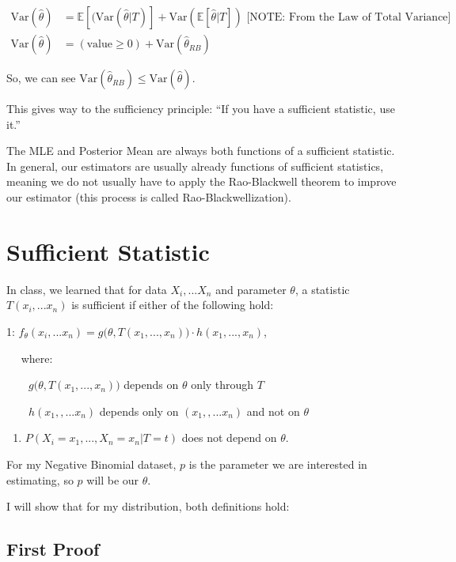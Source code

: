 \documentclass[
  letterpaper,
  DIV=11,
  numbers=noendperiod]{scrreprt}
\providecommand{\tightlist}{%
  \setlength{\itemsep}{0pt}\setlength{\parskip}{0pt}}
\begin{document}
\[
\begin{aligned}
\text{Var}(\hat{\theta}) &= \mathbb{E}[(\text{Var}(\hat{\theta}|T)] + \text{Var}(\mathbb{E}[\hat{\theta}|T]) \text{   [NOTE: From the Law of Total Variance]} \\
\text{Var}(\hat{\theta}) &= (\text{value} \geq 0) + \text{Var}(\hat{\theta}_{RB})
\end{aligned}
\]

So, we can see
\(\text{Var}(\hat{\theta}_{RB}) \leq \text{Var}(\hat{\theta})\).

This gives way to the sufficiency principle: ``If you have a sufficient
statistic, use it.''

The MLE and Posterior Mean are always both functions of a sufficient
statistic. In general, our estimators are usually already functions of
sufficient statistics, meaning we do not usually have to apply the
Rao-Blackwell theorem to improve our estimator (this process is called
Rao-Blackwellization).

\section{Sufficient Statistic}\label{sufficient-statistic}

In class, we learned that for data \(X_i,...X_n\) and parameter
\(\theta\), a statistic \(T(x_i,...x_n)\) is sufficient if either of the
following hold:

1:
\(f_\theta(x_i,...x_n) = g\Big( \theta, T(x_1,...,x_n)\Big) \cdot h(x_1,...,x_n)\),

\(\quad\) where:

\(\qquad g\Big( \theta, T(x_1,...,x_n)\Big)\) depends on \(\theta\) only
through \(T\)

\(\qquad h(x_1,,...x_n)\) depends only on \((x_1,,...x_n)\) and not on
\(\theta\)

\begin{enumerate}
\def\labelenumi{\arabic{enumi}.}
\setcounter{enumi}{1}
\tightlist
\item
  \(P(X_i=x_1,...,X_n=x_n | T = t)\) does not depend on \(\theta\).
\end{enumerate}

For my Negative Binomial dataset, \(p\) is the parameter we are
interested in estimating, so \(p\) will be our \(\theta\).

I will show that for my distribution, both definitions hold:

\subsection{First Proof}\label{first-proof}
\end{document}
